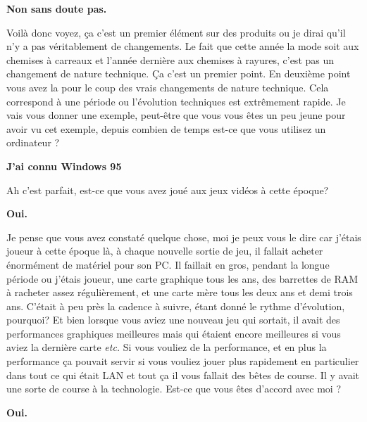 \begin{small}
\smallbreak\textbf{Non sans doute pas.
}\smallbreak

Voilà donc voyez, ça c'est un premier élément sur des produits ou je dirai qu'il n'y a pas véritablement de changements. Le fait que cette année la mode soit aux chemises à carreaux et l'année dernière aux chemises à rayures, c'est pas un changement de nature technique. Ça c'est un premier point.  En deuxième point vous avez la pour le coup des vrais changements de nature technique. Cela correspond à une période ou l'évolution techniques est extrêmement rapide. Je vais vous donner une exemple, peut-être que vous vous êtes un peu jeune pour avoir vu cet exemple, depuis combien de temps est-ce que vous utilisez un ordinateur ?

\smallbreak\textbf{J'ai connu Windows 95
}\smallbreak

Ah c'est parfait, est-ce que vous avez joué aux jeux vidéos à cette époque? 


\smallbreak\textbf{Oui.
}\smallbreak

Je pense que vous avez constaté quelque chose, moi je peux vous le dire car j'étais joueur à cette époque là, à chaque nouvelle sortie de jeu, il fallait acheter énormément de matériel pour son PC. Il faillait en gros, pendant la longue période ou j'étais joueur, une carte graphique tous les ans, des barrettes de RAM à racheter assez régulièrement, et une carte mère tous les deux ans et demi trois ans. C'était à peu près la cadence à suivre, étant donné le rythme d'évolution, pourquoi? Et bien lorsque vous aviez une nouveau jeu qui sortait, il avait des performances graphiques meilleures mais qui étaient encore meilleures si vous aviez la dernière carte \textit{etc.} Si vous vouliez de la performance, et en plus la performance ça pouvait servir si vous vouliez jouer plus rapidement en particulier dans tout ce qui était LAN et tout ça il vous fallait des bêtes de course. Il y avait une sorte de course à la technologie. Est-ce que vous êtes d'accord avec moi ?


\smallbreak\textbf{Oui.
}\smallbreak



\end{small}
